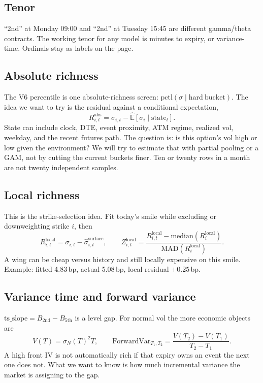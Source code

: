 \documentclass[11pt]{article}
\begin{document}
\subsection{Tenor}

``2nd'' at Monday 09:00 and ``2nd'' at Tuesday 15:45 are different
gamma/theta contracts.  The working tenor for any model is minutes
to expiry, or variance-time.  Ordinals stay as labels on the page.

\subsection{Absolute richness}

The V6 percentile is one absolute-richness screen:
\(\mathrm{pctl}(\sigma\mid\mathrm{hard\ bucket})\).
The idea we want to try is the residual against a conditional
expectation,
\[
R^{\mathrm{abs}}_{i,t}
=
\sigma_{i,t}
-
\widehat{\mathbb{E}}[\sigma_i\mid\mathrm{state}_t].
\]
State can include clock, DTE, event proximity, ATM regime, realized
vol, weekday, and the recent futures path.  The question is: is this
option's vol high or low given the environment?  We will try to
estimate that with partial pooling or a GAM, not by cutting the
current buckets finer.  Ten or twenty rows in a month are not twenty
independent samples.

\subsection{Local richness}

This is the strike-selection idea.  Fit today's smile while
excluding or downweighting strike \(i\), then
\[
R^{\mathrm{local}}_{i,t}
=
\sigma_{i,t}-\hat\sigma^{\mathrm{surface}}_{i,t},
\qquad
Z^{\mathrm{local}}_{i,t}
=
\frac{R^{\mathrm{local}}_{i,t}-\mathrm{median}(R^{\mathrm{local}}_i)}
{\mathrm{MAD}(R^{\mathrm{local}}_i)}.
\]
A wing can be cheap versus history and still locally expensive on
this smile.  Example: fitted 4.83\,bp, actual 5.08\,bp, local
residual \(+0.25\)\,bp.

\subsection{Variance time and forward variance}

\(\mathrm{ts\_slope}=B_{2\mathrm{nd}}-B_{5\mathrm{th}}\) is a level
gap.  For normal vol the more economic objects are
\[
V(T)=\sigma_N(T)^2 T,
\qquad
\mathrm{ForwardVar}_{T_1,T_2}
=
\frac{V(T_2)-V(T_1)}{T_2-T_1}.
\]
A high front IV is not automatically rich if that expiry owns an
event the next one does not.  What we want to know is how much
incremental variance the market is assigning to the gap.
\end{document}
